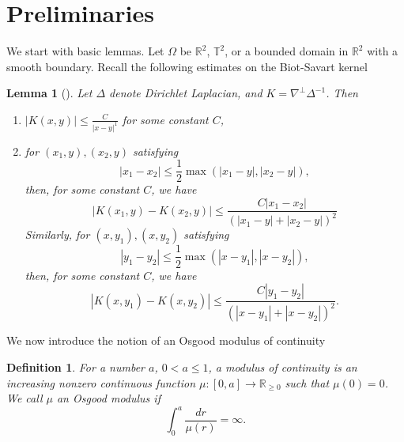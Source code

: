 \documentclass[12pt]{article}
\newtheorem{lemma}{Lemma}
\newtheorem{definition}{Definition}
\begin{document}
\section{Preliminaries}
We start with basic lemmas. Let $\Omega$ be $\mathbb{R}^2$, $\mathbb{T}^2$, or a bounded domain in $\mathbb{R}^2$ with a smooth boundary. Recall the following estimates on the Biot-Savart kernel
\begin{lemma}[\cite{MP}] \label{Kernelestim} Let $\Delta$ denote Dirichlet Laplacian, and $K = \nabla^\perp \Delta^{-1}$. Then
\begin{enumerate}
\item $| K  (x,y) | \le \frac{C}{|x-y|^{1} }$ for some constant $C$,
\item for $(x_1, y), (x_2, y)$ satisfying
\begin{equation} \label{yfar}
|x_1 - x_2 | \le \frac{1}{2} \max (|x_1 - y|, |x_2 - y|),
\end{equation}
then,  for some  constant $C$, we have
\begin{equation}
|K (x_1, y) - K  (x_2, y) | \le \frac{C |x_1 - x_2 | }{ (|x_1 - y| + |x_2 - y| )^{2}  }
\end{equation}
 Similarly, for $(x, y_1), (x, y_2)$ satisfying
\begin{equation} \label{xfar}
|y_1 - y_2| \le \frac{1}{2} \max (|x- y_1|, |x- y_2 | ),
\end{equation}
then,  for some  constant $C$, we have
\begin{equation}
|K (x, y_1) - K  (x, y_2) | \le \frac{C |y_1 - y_2 | }{(|x - y_1| + |x - y_2|)^{2} }.
\end{equation}
\end{enumerate}
\end{lemma}





We now introduce the notion of an Osgood modulus  of continuity

\begin{definition} For a number $a$, $0 < a \le 1$, a modulus of continuity is an increasing nonzero continuous function $\mu: [0, a] \rightarrow \mathbb{R}_{\ge 0}$ such that $\mu(0) = 0$. 
We call $\mu$ an Osgood modulus if
\begin{equation*}
\int_0 ^a \frac{dr}{\mu(r) } = \infty.
\end{equation*} 
\end{definition}
\end{document}

